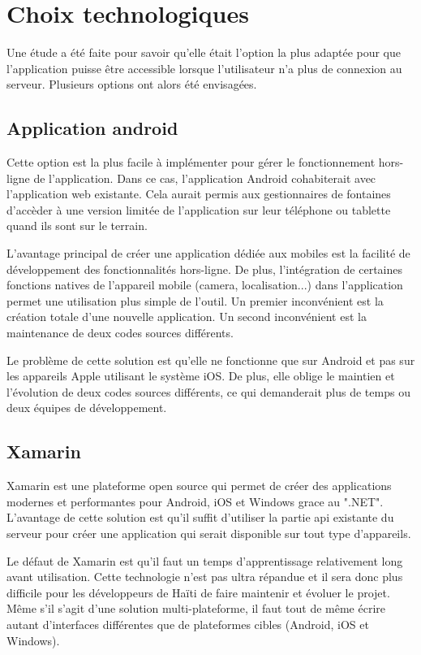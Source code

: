 \documentclass{EPL-master-thesis-covers-FR}
\begin{document}
		
		\section{Choix technologiques}
		
			
			\label{sec:choix_tech}
			Une étude a été faite pour savoir qu'elle était l'option la plus adaptée pour que l'application puisse être accessible lorsque l'utilisateur n'a plus de connexion au serveur. Plusieurs options ont alors été envisagées.
			
			\subsection*{Application android}
				Cette option est la plus facile à implémenter pour gérer le fonctionnement hors-ligne de l'application. Dans ce cas, l'application Android cohabiterait avec l'application web existante. Cela aurait permis aux gestionnaires de fontaines d'accèder à une version limitée de l'application sur leur téléphone ou tablette quand ils sont sur le terrain.
				
				L'avantage principal de créer une application dédiée aux mobiles est la facilité de développement des fonctionnalités hors-ligne. De plus, l'intégration de certaines fonctions natives de l'appareil mobile (camera, localisation...) dans l'application permet une utilisation plus simple de l'outil. Un premier inconvénient est la création totale d'une nouvelle application. Un second inconvénient est la maintenance de deux codes sources différents.
			
				Le problème de cette solution est qu'elle ne fonctionne que sur Android et pas sur les appareils Apple utilisant le système iOS. De plus, elle oblige le maintien et l'évolution de deux codes sources différents, ce qui demanderait plus de temps ou deux équipes de développement.
				
			\subsection*{Xamarin}
				Xamarin \cite{ref:xamarin} est une plateforme open source qui permet de créer des applications modernes et performantes pour Android, iOS et Windows grace au ".NET". L'avantage de cette solution est qu'il suffit d'utiliser la partie \gls{api} existante du serveur pour créer une application qui serait disponible sur tout type d'appareils.
			
				Le défaut de Xamarin est qu'il faut un temps d'apprentissage relativement long avant utilisation. Cette technologie n'est pas ultra répandue et il sera donc plus difficile pour les développeurs de Haïti de faire maintenir et évoluer le projet. Même s'il s'agit d'une solution multi-plateforme, il faut tout de même écrire autant d'interfaces différentes que de plateformes cibles (Android, iOS et Windows).
				
\end{document}
